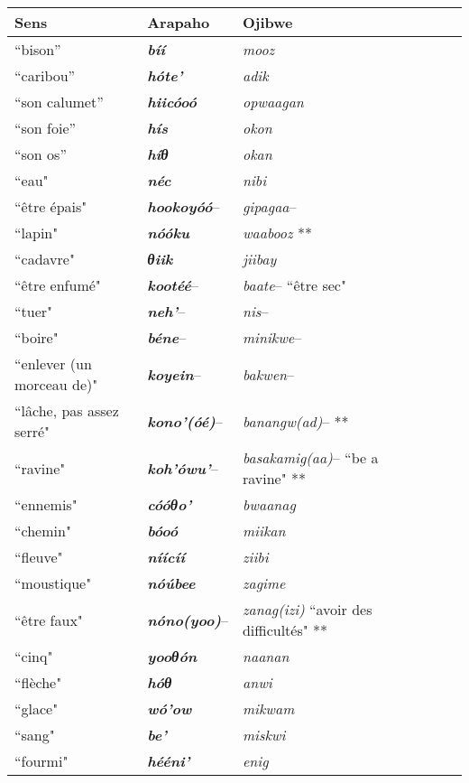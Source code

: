 \documentclass[twoside,a4paper,11pt]{article}
\newcommand{\ipa}[1]{{\phon\textbf{\textit{#1}}}}
\newcommand{\Σ}{\greek{Σ}}
\begin{document}
 \begin{table}[h]
 \centering
\begin{tabular}{lllllll}
\toprule
Sens & Arapaho &  Ojibwe \\
\midrule
``bison'' & \ipa{bíí} & \textit{mooz} \\
``caribou'' & \ipa{hóte'} & \textit{adik} \\
``son calumet'' & \ipa{hiicóoó} & \textit{opwaagan} \\
``son foie'' & \ipa{hís} & \textit{okon} \\
``son  os'' & \ipa{híθ} & \textit{okan} \\
 ``eau" & \ipa{néc}     &  \textit{nibi} \\
  ``être épais" & \ipa{hookoyóó}--    &  \textit{gipagaa}-- \\
 ``lapin" & \ipa{nóóku}     &  \textit{waabooz} **\\
  ``cadavre" & \ipa{θiik}    &  \textit{jiibay} \\
  ``être enfumé" & \ipa{kootéé}--    &  \textit{baate}-- ``être sec"\\
  ``tuer" & \ipa{neh'}--    &  \textit{nis}--  \\
    ``boire" & \ipa{béne}--    &  \textit{minikwe}--  \\
  ``enlever (un morceau de)" & \ipa{koyein}--    &  \textit{bakwen}-- \\
  ``lâche, pas assez serré" & \ipa{kono'(óé)}--    &  \textit{banangw(ad)}-- **\\ 
 ``ravine" & \ipa{koh'ówu'}--    &  \textit{basakamig(aa)}-- ``be a ravine" **\\ 
 ``ennemis" &   \ipa{cóóθo'}  & \textit{bwaanag} \\
 ``chemin" & \ipa{bóoó} &  \textit{miikan} \\
 ``fleuve" &  \ipa{níícíí}       &  \textit{ziibi} \\
``moustique"  & \ipa{nóúbee}  &  \textit{zagime} \\
``être faux"  & \ipa{nóno(yoo)}--   & \textit{zanag(izi)} ``avoir des difficultés" ** \\
``cinq" & \ipa{yooθón} & \textit{naanan} \\
``flèche" & \ipa{hóθ} &  \textit{anwi} \\
``glace" & \ipa{wó'ow} &  \textit{mikwam} \\
``sang" & \ipa{be'} &  \textit{miskwi} \\
``fourmi" & \ipa{hééni'} &  \textit{enig} \\

\end{tabular}
\end{table}
\end{document}
